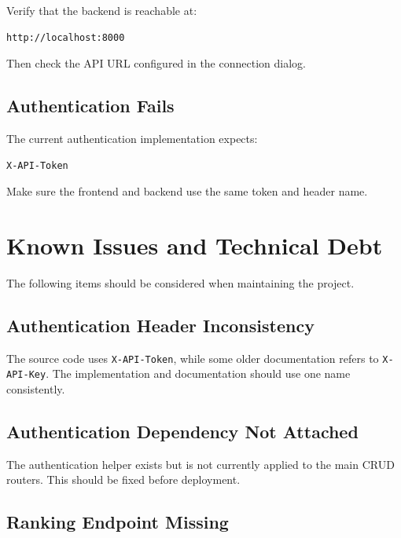 \documentclass[12pt,a4paper]{article}
\begin{document}
Verify that the backend is reachable at:

\begin{lstlisting}
http://localhost:8000
\end{lstlisting}

Then check the API URL configured in the connection dialog.

\subsection{Authentication Fails}

The current authentication implementation expects:

\begin{lstlisting}
X-API-Token
\end{lstlisting}

Make sure the frontend and backend use the same token and header name.


\section{Known Issues and Technical Debt}
\label{sec:technical-debt}

The following items should be considered when maintaining the project.

\subsection{Authentication Header Inconsistency}

The source code uses \texttt{X-API-Token}, while some older
documentation refers to \texttt{X-API-Key}. The implementation and
documentation should use one name consistently.

\subsection{Authentication Dependency Not Attached}

The authentication helper exists but is not currently applied to the
main CRUD routers. This should be fixed before deployment.

\subsection{Ranking Endpoint Missing}
\end{document}
